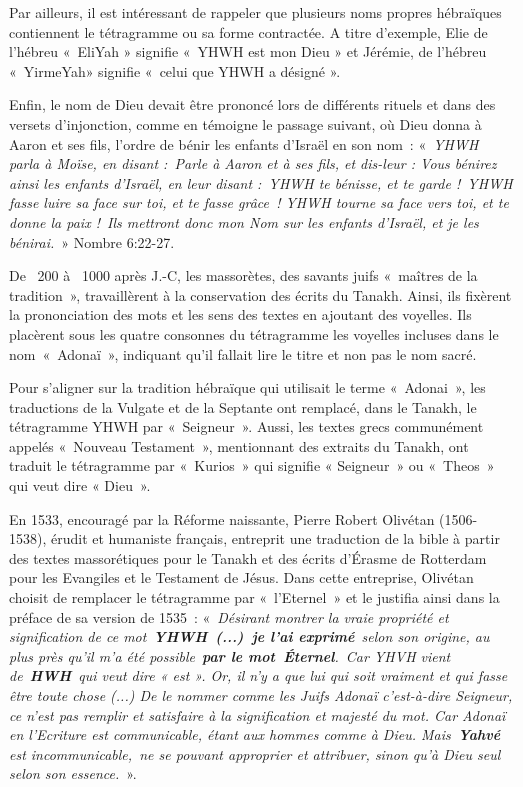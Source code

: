 \begin{small}
Par ailleurs, il est intéressant de rappeler que plusieurs noms propres hébraïques contiennent le tétragramme ou sa forme contractée. A titre d'exemple, Elie de l'hébreu « EliYah » signifie « YHWH est mon Dieu » et Jérémie, de l'hébreu « YirmeYah» signifie « celui que YHWH a désigné ».\bigskip

Enfin, le nom de Dieu devait être prononcé lors de différents rituels et dans des versets d'injonction, comme en témoigne le passage suivant, où Dieu donna à Aaron et ses fils, l'ordre de bénir les enfants d'Israël en son nom : « \emph{YHWH parla à Moïse, en disant : Parle à Aaron et à ses fils, et dis-leur : Vous bénirez ainsi les enfants d'Israël, en leur disant : YHWH te bénisse, et te garde ! YHWH fasse luire sa face sur toi, et te fasse grâce ! YHWH tourne sa face vers toi, et te donne la paix ! Ils mettront donc mon Nom sur les enfants d'Israël, et je les bénirai.} » Nombre 6:22-27.\bigskip

De ~200 à ~1000 après J.-C, les massorètes, des savants juifs « maîtres de la tradition », travaillèrent à la conservation des écrits du Tanakh. Ainsi, ils  fixèrent la prononciation des mots et les sens des textes en ajoutant des voyelles. Ils placèrent sous les quatre consonnes du tétragramme les voyelles incluses dans le nom « Adonaï », indiquant qu'il fallait lire le titre et non pas le nom sacré.\bigskip

Pour s'aligner sur la tradition hébraïque qui utilisait le terme « Adonai », les traductions de la Vulgate et de la Septante ont remplacé, dans le Tanakh, le tétragramme YHWH par « Seigneur ». Aussi, les textes grecs communément appelés « Nouveau Testament », mentionnant des extraits du Tanakh, ont traduit le tétragramme par « Kurios » qui signifie « Seigneur » ou « Theos » qui veut dire « Dieu ».\bigskip

En 1533, encouragé par la Réforme naissante, Pierre Robert Olivétan (1506-1538), érudit et humaniste français, entreprit une traduction de la bible à partir des textes massorétiques pour le Tanakh et des écrits d'Érasme de Rotterdam pour les Evangiles et le Testament de Jésus. Dans cette entreprise, Olivétan choisit de remplacer le tétragramme par « l'Eternel » et le justifia ainsi dans la préface de sa version de 1535 :\newline
« \emph{Désirant montrer la vraie propriété et signification de ce mot \textbf{YHWH (...) je l'ai exprimé} selon son origine, au plus près qu'il m'a été possible \textbf{par le mot Éternel}. Car YHVH vient de \textbf{HWH} qui veut dire « est ». Or, il n'y a que lui qui soit vraiment et qui fasse être toute chose (...) De le nommer comme les Juifs Adonaï c'est-à-dire Seigneur, ce n'est pas remplir et satisfaire à la signification et majesté du mot. Car Adonaï en l'Ecriture est communicable, étant aux hommes comme à Dieu. Mais \textbf{Yahvé} est incommunicable, ne se pouvant approprier et attribuer, sinon qu'à Dieu seul selon son essence.} ».\bigskip


\end{small}
